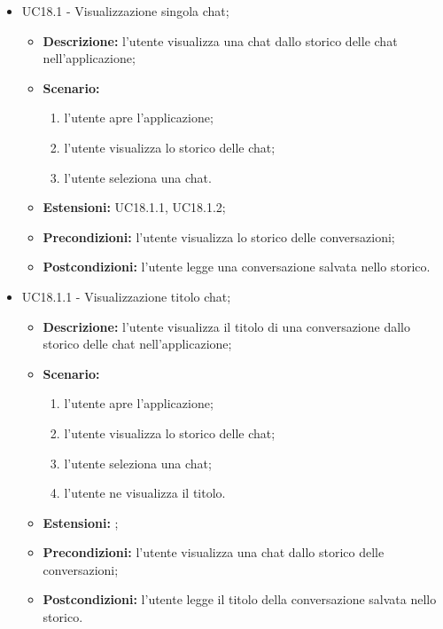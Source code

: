 \documentclass[10pt, a4paper]{article}
\begin{document}
\begin{itemize}
    \item UC18.1 - Visualizzazione singola chat;
    \begin{itemize}
        \item \textbf{Descrizione: }l'utente visualizza una chat dallo storico delle chat nell'applicazione;
        \item \textbf{Scenario: }
        \begin{enumerate}[label={\arabic*.}, align=left]
        \item l'utente apre l'applicazione;
        \item l'utente visualizza lo storico delle chat;
        \item l'utente seleziona una chat.
        \end{enumerate}
        \item \textbf{Estensioni: }UC18.1.1, UC18.1.2;
        \item \textbf{Precondizioni:} l'utente visualizza lo storico delle conversazioni;
        \item \textbf{Postcondizioni: }l'utente legge una conversazione salvata nello storico.
    \end{itemize}
    
    \item UC18.1.1 - Visualizzazione titolo chat;
    \begin{itemize}
         \item \textbf{Descrizione: }l'utente visualizza il titolo di una conversazione dallo storico delle chat nell'applicazione;
        \item \textbf{Scenario: }
        \begin{enumerate}[label={\arabic*.}, align=left]
        \item l'utente apre l'applicazione;
        \item l'utente visualizza lo storico delle chat;
        \item l'utente seleziona una chat;
        \item l'utente ne visualizza il titolo.
        \end{enumerate}
        \item \textbf{Estensioni: };
        \item \textbf{Precondizioni:} l'utente visualizza una chat dallo storico delle conversazioni;
        \item \textbf{Postcondizioni: }l'utente legge il titolo della conversazione salvata nello storico.
    \end{itemize}
    

\end{itemize}
\end{document}
